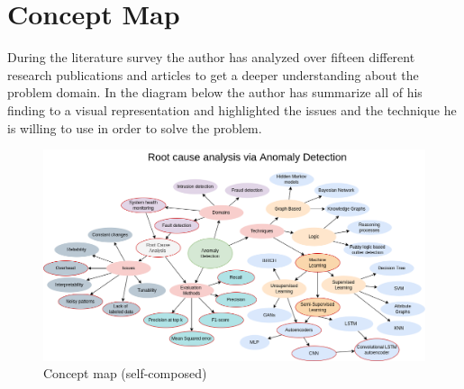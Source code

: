 \section{Concept Map}

During the literature survey the author has analyzed over fifteen different research publications and articles to get a deeper understanding about the problem domain. In the diagram below the author has summarize all of his finding to a visual representation and highlighted the issues and the technique he is willing to use in order to solve the problem.


\begin{figure}[H]
    \includegraphics[width=16cm]{assets/literature-review/concept-map.png}
    \caption{Concept map (self-composed)}
    \label{fig:concept-map}
\end{figure}
